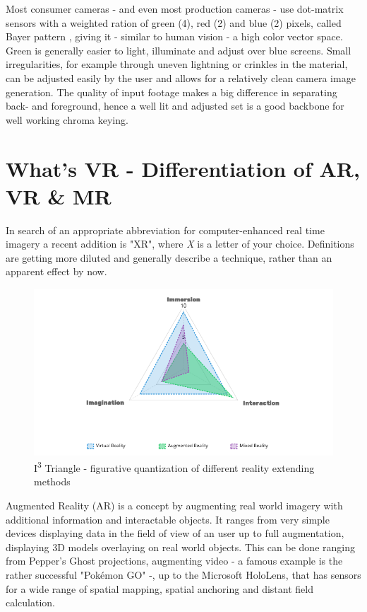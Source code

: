 Most consumer cameras - and even most production cameras - use dot-matrix 
sensors with a weighted ration of green (4), red (2) and blue (2) pixels, 
called Bayer pattern \cite{kodak:bayer:1976}, giving it - similar to human 
vision - a high color vector space. Green is generally easier to light, 
illuminate and adjust over blue screens. Small irregularities, for example 
through uneven lightning or crinkles in the material, can be adjusted easily by 
the user and allows for a relatively clean camera image generation.
\newline
The quality of input footage makes a big difference in separating back- and 
foreground, hence a well lit and adjusted set is a good backbone for well 
working chroma keying.

\section{What's VR - Differentiation of AR, VR \& MR}

In search of an appropriate abbreviation for computer-enhanced real time 
imagery a recent addition is "XR", where \textit{X} is a letter of your choice. 
Definitions are getting more diluted and generally describe a technique, rather 
than an apparent effect by now.

\begin{figure}[htb]
	\includegraphics[width=\textwidth]{_raw_resources/i3-triangle.png}
	\caption{I\textsuperscript{3} Triangle - figurative quantization of 
		different reality extending methods}
	\label{fig:xr:i3-triangle}
\end{figure}
Augmented Reality (AR) is a concept by augmenting real world imagery with 
additional information and interactable objects. It ranges from very simple 
devices displaying data in the field of view of an user up to full 
augmentation, displaying 3D models overlaying on real world objects. This can 
be done ranging from Pepper's Ghost projections, augmenting video - a famous 
example is the rather successful "Pokémon GO" -, up to the Microsoft HoloLens, 
that has sensors for a wide range of spatial mapping, spatial anchoring and 
distant field calculation.


